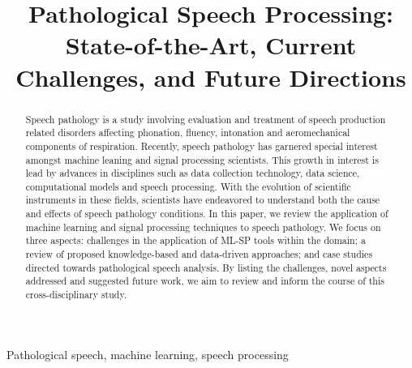 \documentclass{article}
\title{Pathological Speech Processing:\\State-of-the-Art, Current Challenges, and Future Directions}
\begin{document}
\ninept
%
\maketitle
%
\begin{abstract}
Speech pathology is a study involving evaluation and treatment of speech production related disorders affecting phonation, fluency, intonation and aeromechanical components of respiration.
Recently, speech pathology has garnered special interest amongst machine leaning and signal processing scientists.
This growth in interest is lead by advances in disciplines such as data collection technology, data science, computational models and speech processing. 
With the evolution of scientific instruments in these fields, scientists have endeavored to understand both the cause and effects of speech pathology conditions.  
In this paper, we review the application of machine learning and signal processing techniques to speech pathology.
We focus on three aspects: challenges in the application of ML-SP tools within the domain; a review of proposed knowledge-based and data-driven approaches; and case studies directed towards pathological speech analysis.
By listing the challenges, novel aspects addressed and suggested future work, we aim to review and inform the course of this cross-disciplinary study.
    
 
\end{abstract}
%
\begin{keywords}
Pathological speech, machine learning, speech processing 
\end{keywords}
%
\end{document}

